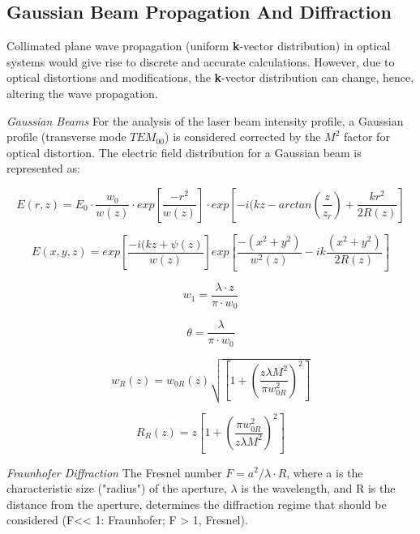 \subsection{Gaussian Beam Propagation And Diffraction}
	\label{diffraction}
	
Collimated plane wave propagation (uniform \textbf{k}-vector distribution) in optical systems would give rise to discrete and accurate calculations. However, due to optical distortions and modifications, the \textbf{k}-vector distribution can change, hence, altering the wave propagation. 

\textit{Gaussian Beams}
For the analysis of the \acs{laser} beam intensity profile, a Gaussian profile (transverse mode $TEM_{00}$) is considered corrected by the $M^{2}$ factor for optical distortion. The electric field distribution for a Gaussian beam is represented as:

\begin{equation}
	E(r,z) = E_{0}\cdot \frac{w_{0}}{w(z)} \cdot exp\left[\frac{-r^{2}}{w(z)}\right]\cdot exp\left[-i(kz-arctan\left(\frac{z}{z_{r}}\right)+\frac{kr^{2}}{2R(z)}\right]
\end{equation}

\begin{equation}
	E(x,y,z) = exp\left[\frac{-i(kz + \psi(z)}{w(z)}\right]exp\left[\frac{-(x^{2}+y^{2})}{w^{2}(z)} - ik \frac{(x^{2}+y^{2})}{2R(z)}\right]
\end{equation}

\begin{equation}
w_{1} = \frac{\lambda \cdot z}{\pi\cdot w_{0}}
\end{equation}

\begin{equation}
\theta = \frac{\lambda}{\pi\cdot w_{0}}
\end{equation}

\begin{equation}
w_{R}(z)=w_{0R}(z)\sqrt{\left[1 + \left(\frac{z\lambda M^{2}}{\pi w_{0R}^{2}}\right)^{2}\right]}
\end{equation}

\begin{equation}
R_{R}(z)=z\left[1 + \left(\frac{\pi w_{0R}^{2}}{z\lambda M^{2}}\right)^{2}\right]
\end{equation}


\textit{Fraunhofer Diffraction} 
The Fresnel number $F = a^{2}/\lambda \cdot R$, where a is the characteristic size ("radius") of the aperture,  $\lambda$ is the wavelength, and R is the distance from the aperture, determines the diffraction regime that should be considered (F<< 1: Fraunhofer; F > 1, Fresnel).


